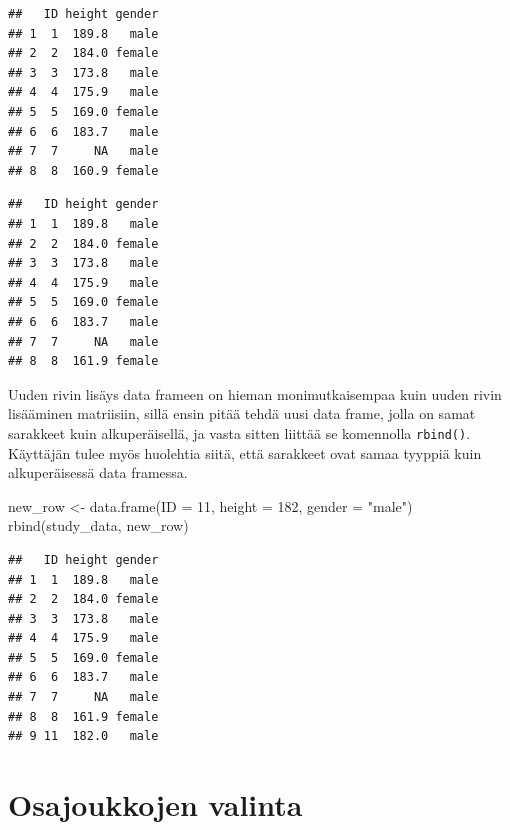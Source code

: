 \documentclass[
]{book}
\newenvironment{Shaded}{\begin{snugshade}}{\end{snugshade}}
\newcommand{\AttributeTok}[1]{\textcolor[rgb]{0.77,0.63,0.00}{#1}}
\newcommand{\CommentTok}[1]{\textcolor[rgb]{0.56,0.35,0.01}{\textit{#1}}}
\newcommand{\DecValTok}[1]{\textcolor[rgb]{0.00,0.00,0.81}{#1}}
\newcommand{\FloatTok}[1]{\textcolor[rgb]{0.00,0.00,0.81}{#1}}
\newcommand{\FunctionTok}[1]{\textcolor[rgb]{0.00,0.00,0.00}{#1}}
\newcommand{\NormalTok}[1]{#1}
\newcommand{\OtherTok}[1]{\textcolor[rgb]{0.56,0.35,0.01}{#1}}
\newcommand{\SpecialCharTok}[1]{\textcolor[rgb]{0.00,0.00,0.00}{#1}}
\newcommand{\StringTok}[1]{\textcolor[rgb]{0.31,0.60,0.02}{#1}}
\begin{document}
\begin{verbatim}
##   ID height gender
## 1  1  189.8   male
## 2  2  184.0 female
## 3  3  173.8   male
## 4  4  175.9   male
## 5  5  169.0 female
## 6  6  183.7   male
## 7  7     NA   male
## 8  8  160.9 female
\end{verbatim}

\begin{Shaded}
\end{Shaded}

\begin{verbatim}
##   ID height gender
## 1  1  189.8   male
## 2  2  184.0 female
## 3  3  173.8   male
## 4  4  175.9   male
## 5  5  169.0 female
## 6  6  183.7   male
## 7  7     NA   male
## 8  8  161.9 female
\end{verbatim}

Uuden rivin lisäys data frameen on hieman monimutkaisempaa kuin uuden rivin lisääminen matriisiin, sillä ensin pitää tehdä uusi data frame, jolla on samat sarakkeet kuin alkuperäisellä, ja vasta sitten liittää se komennolla \texttt{rbind()}. Käyttäjän tulee myös huolehtia siitä, että sarakkeet ovat samaa tyyppiä kuin alkuperäisessä data framessa.

\begin{Shaded}
\begin{Highlighting}[]
\NormalTok{new\_row }\OtherTok{\textless{}{-}} \FunctionTok{data.frame}\NormalTok{(}\AttributeTok{ID =} \DecValTok{11}\NormalTok{, }\AttributeTok{height =} \DecValTok{182}\NormalTok{, }\AttributeTok{gender =} \StringTok{"male"}\NormalTok{)}
\FunctionTok{rbind}\NormalTok{(study\_data, new\_row)}
\end{Highlighting}
\end{Shaded}

\begin{verbatim}
##   ID height gender
## 1  1  189.8   male
## 2  2  184.0 female
## 3  3  173.8   male
## 4  4  175.9   male
## 5  5  169.0 female
## 6  6  183.7   male
## 7  7     NA   male
## 8  8  161.9 female
## 9 11  182.0   male
\end{verbatim}

\hypertarget{osajoukkojen-valinta}{%
\section{Osajoukkojen valinta}\label{osajoukkojen-valinta}}
\end{document}
